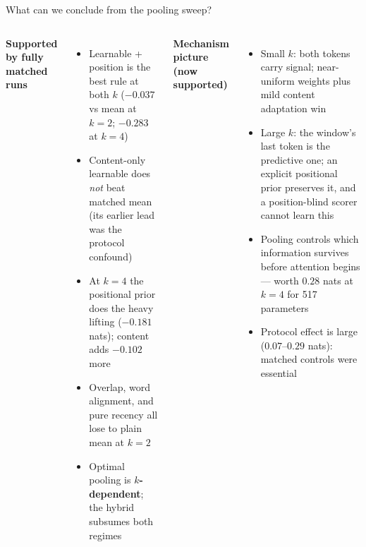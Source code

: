 \documentclass[10pt,aspectratio=169]{beamer}
\newcommand{\good}[1]{\textcolor{okgreen}{#1}}
\begin{document}
\begin{frame}{What can we conclude from the pooling sweep?}
  \begin{columns}[T]
    \textbf{\good{Supported by fully matched runs}}
    \begin{itemize}
      \item \good{Learnable + position is the best rule at both $k$}
            ($-0.037$ vs mean at $k{=}2$; $-0.283$ at $k{=}4$)
      \item Content-only learnable does \emph{not} beat matched mean
            (its earlier lead was the protocol confound)
      \item At $k{=}4$ the positional prior does the heavy lifting
            ($-0.181$ nats); content adds $-0.102$ more
      \item Overlap, word alignment, and pure recency all lose to plain
            mean at $k{=}2$
      \item Optimal pooling is \textbf{$k$-dependent}; the hybrid subsumes
            both regimes
    \end{itemize}

    \textbf{Mechanism picture (now supported)}
    \begin{itemize}
      \item Small $k$: both tokens carry signal; near-uniform weights plus
            mild content adaptation win
      \item Large $k$: the window's last token is the predictive one; an
            explicit positional prior preserves it, and a position-blind
            scorer cannot learn this
      \item Pooling controls which information survives before attention
            begins --- worth $0.28$ nats at $k{=}4$ for 517 parameters
      \item Protocol effect is large ($0.07$--$0.29$ nats): matched controls
            were essential
    \end{itemize}
  \end{columns}

\end{frame}
\end{document}
